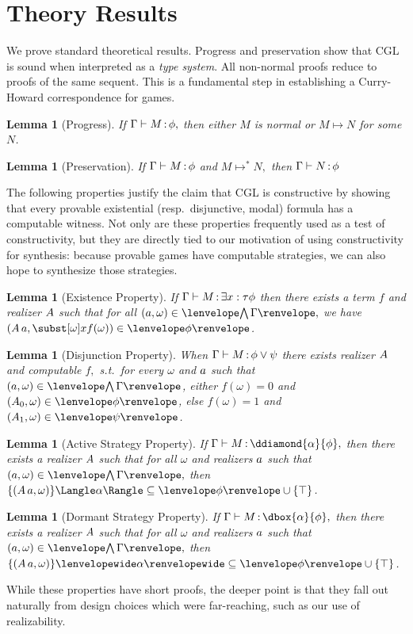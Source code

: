 \documentclass[12pt]{cmuthesis}
\newtheorem{lemma}[theorem]{Lemma}
\theoremstyle{definition}
\theoremstyle{remark}
\newcommand{\stepsto}{\mapsto}
\newcommand{\om}{\omega}
\newcommand{\CGL}{\textsf{CGL}\xspace}
\newcommand{\G}{\Gamma}
\begin{document}
\section{Theory Results}
We prove standard theoretical results.
Progress and preservation show that \CGL is sound when interpreted as a \emph{type system}.
All non-normal proofs reduce to proofs of the same sequent.
This is a fundamental step in establishing a Curry-Howard correspondence for games.
\begin{lemma}[Progress]
If $\proves{\Gamma}{M}{\phi},$ then either $M$ is normal or $M \stepsto N$ for some $N$.
\end{lemma}
\begin{lemma}[Preservation]
If $\proves{\Gamma}{M}{\phi}$ and $M \stepsto^* N,$ then $\proves{\Gamma}{N}{\phi}$
\end{lemma}

The following properties justify the claim that \CGL is constructive by showing that every provable existential (resp.\ disjunctive, modal) formula has a computable witness.
Not only are these properties frequently used as a test of constructivity, but they are directly tied to our motivation of using constructivity for synthesis: because provable games have computable strategies, we can also hope to synthesize those strategies.
\begin{lemma}[Existence Property]
If $\proves{\Gamma}{M}{\exists{x:\tau}{\phi}}$ then there exists a term $f$ and realizer $\ab$ such that for all $(\aa,\om) \in \cintR{\G},$
we have $(\rzApp{\ab}{\aa},\ssub{\om}{x}{f(\om)}) \in \fintR{\phi}$.
\label{lem:term-ep}
\end{lemma}
\begin{lemma}[Disjunction Property]
When $\proves{\Gamma}{M}{\phi \lor \psi}$ there exists realizer $\ab$ and computable $f,$ s.t.\ for every $\om$ and $\aa$ such that $(\aa,\omega) \in \cintR{\G}$, either $f(\omega)=0$ and $(\rzFst{\ab},\omega) \in \fintR{\phi}{}$, else $f(\omega)=1$ and $(\rzSnd{\ab},\omega) \in \fintR{\psi}$.
\end{lemma}
\begin{lemma}[Active Strategy Property]
If $\proves{\Gamma}{M}{\ddiamond{\alpha}{\phi}},$ then there exists a realizer $\ab$ such that for all $\om$ and realizers $\aa$ such that $(\aa,\om) \in \cintR{\G},$ 
then $\strategyforR[\alpha]{\{(\rzApp{\ab}{\aa},\om)\}} \subseteq \fintR{\phi} \cup \{\stt\}$.
\end{lemma}
\begin{lemma}[Dormant Strategy Property]
If $\proves{\Gamma}{M}{\dbox{\alpha}{\phi}},$ then there exists a realizer $\ab$ such that for all $\om$ and realizers $\aa$ such that $(\aa,\om) \in \cintR{\G},$ 
then $\dstrategyforR[\alpha]{\{(\rzApp{\ab}{\aa},\om)\}} \subseteq \fintR{\phi} \cup \{\stt\}$.
\end{lemma}
While these properties have short proofs, the deeper point is that they fall out naturally from design choices which were far-reaching, such as our use of realizability.
\end{document}
